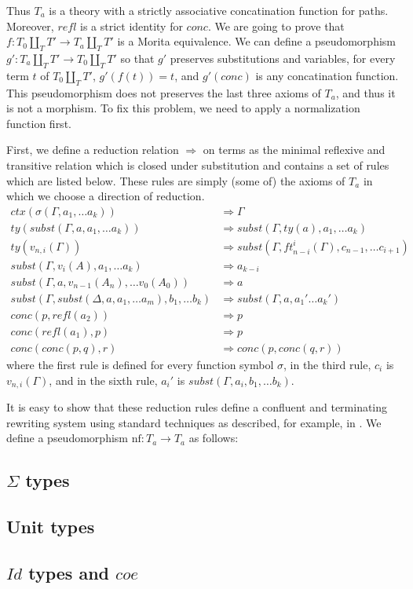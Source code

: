\documentclass[reqno]{amsart}
\theoremstyle{definition}
\theoremstyle{remark}
\newcommand{\nf}{\mathrm{nf}}
\newcommand{\red}{\Rightarrow}
\numberwithin{figure}{section}
\begin{document}
Thus $T_a$ is a theory with a strictly associative concatination function for paths.
Moreover, $refl$ is a strict identity for $conc$.
We are going to prove that $f : T_0 \amalg_T T' \to T_a \amalg_T T'$ is a Morita equivalence.
We can define a pseudomorphism $g' : T_a \amalg_T T' \to T_0 \amalg_T T'$ so that $g'$ preserves substitutions and variables,
for every term $t$ of $T_0 \amalg_T T'$, $g'(f(t)) = t$, and $g'(conc)$ is any concatination function.
This pseudomorphism does not preserves the last three axioms of $T_a$, and thus it is not a morphism.
To fix this problem, we need to apply a normalization function first.

First, we define a reduction relation $\red$ on terms as the minimal reflexive and transitive relation
which is closed under substitution and contains a set of rules which are listed below.
These rules are simply (some of) the axioms of $T_a$ in which we choose a direction of reduction.
\begin{align*}
ctx(\sigma(\Gamma, a_1, \ldots a_k)) & \red \Gamma \\
ty(subst(\Gamma, a, a_1, \ldots a_k)) & \red subst(\Gamma, ty(a), a_1, \ldots a_k) \\
ty(v_{n,i}(\Gamma)) & \red subst(\Gamma, ft^i_{n-i}(\Gamma), c_{n-1}, \ldots c_{i+1}) \\
subst(\Gamma, v_i(A), a_1, \ldots a_k) & \red a_{k-i} \\
subst(\Gamma, a, v_{n-1}(A_n), \ldots v_0(A_0)) & \red a \\
subst(\Gamma, subst(\Delta, a, a_1, \ldots a_m), b_1, \ldots b_k) & \red subst(\Gamma, a, a_1' \ldots a_k') \\
conc(p,refl(a_2)) & \red p \\
conc(refl(a_1),p) & \red p \\
conc(conc(p,q),r) & \red conc(p,conc(q,r))
\end{align*}
where the first rule is defined for every function symbol $\sigma$,
in the third rule, $c_i$ is $v_{n,i}(\Gamma)$,
and in the sixth rule, $a_i'$ is $subst(\Gamma, a_i, b_1, \ldots b_k)$.

It is easy to show that these reduction rules define a confluent and terminating rewriting system using standard techniques as described, for example, in \cite{Terese}.
We define a pseudomorphism $\nf : T_a \to T_a$ as follows:

\subsection{$\Sigma$ types}

\subsection{Unit types}

\subsection{$Id$ types and $coe$}



\end{document}
